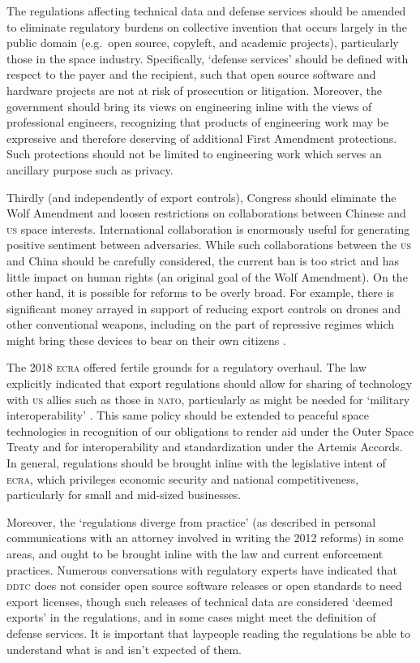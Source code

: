 \documentclass[12pt]{olfmemo}
\begin{document}
The regulations affecting technical data and defense services should be amended to eliminate regulatory burdens on collective invention that occurs largely in the public domain (e.g.\ open source, copyleft, and academic projects), particularly those in the space industry. Specifically, `defense services' should be defined with respect to the payer and the recipient, such that open source software and hardware projects are not at risk of prosecution or litigation. Moreover, the government should bring its views on engineering inline with the views of professional engineers, recognizing that products of engineering work may be expressive and therefore deserving of additional First Amendment protections. Such protections should not be limited to engineering work which serves an ancillary purpose such as privacy.

Thirdly (and independently of export controls), Congress should eliminate the Wolf Amendment and loosen restrictions on collaborations between Chinese and \textsc{us} space interests. International collaboration is enormously useful for generating positive sentiment between adversaries. While such collaborations between the \textsc{us} and China should be carefully considered, the current ban is too strict and has little impact on human rights (an original goal of the Wolf Amendment). On the other hand, it is possible for reforms to be overly broad. For example, there is significant money arrayed in support of reducing export controls on drones and other conventional weapons, including on the part of repressive regimes which might bring these devices to bear on their own citizens \citep{Summers2020}.

The 2018 \textsc{ecra} offered fertile grounds for a regulatory overhaul. The law explicitly indicated that export regulations should allow for sharing of technology with \textsc{us} allies such as those in \textsc{nato}, particularly as might be needed for `military interoperability' \citep{ECRA2018}. This same policy should be extended to peaceful space technologies in recognition of our obligations to render aid under the Outer Space Treaty and for interoperability and standardization under the Artemis Accords. In general, regulations should be brought inline with the legislative intent of \textsc{ecra}, which privileges economic security and national competitiveness, particularly for small and mid-sized businesses.

Moreover, the `regulations diverge from practice' (as described in personal communications with an attorney involved in writing the 2012 reforms) in some areas, and ought to be brought inline with the law and current enforcement practices. Numerous conversations with regulatory experts have indicated that \textsc{ddtc} does not consider open source software releases or open standards to need export licenses, though such releases of technical data are considered `deemed exports' in the regulations, and in some cases might meet the definition of defense services. It is important that laypeople reading the regulations be able to understand what is and isn't expected of them.
\end{document}
